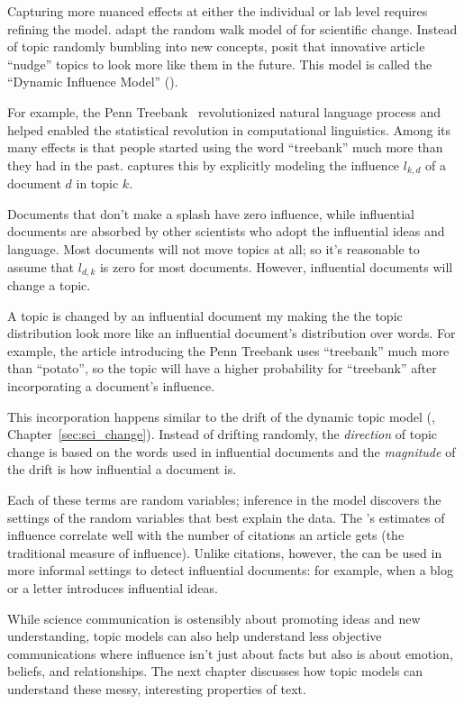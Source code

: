 Capturing more nuanced effects at either the individual or lab level requires
refining the model.  \citet{gerrish-10} adapt the random walk model of
\citet{wang-08} for scientific change.  Instead of topic randomly bumbling into
new concepts, \citet{gerrish-10} posit that innovative article ``nudge'' topics
to look more like them in the future.  This model is called the ``Dynamic
Influence Model'' ().

For example, the Penn Treebank~\citep{marcus-93} revolutionized natural language
process and helped enabled the statistical revolution in computational
linguistics.  Among its many effects is that people started using the word
``treebank'' much more than they had in the past.   captures this by
explicitly modeling the influence $l_{k,d}$ of a document $d$ in topic
$k$.

Documents that don't make a splash have zero influence, while influential
documents are absorbed by other scientists who adopt the influential ideas and
language.  Most documents will not move topics
at all; so it's reasonable to assume that $l_{d,k}$ is zero for most
documents.  However, influential documents will change a topic.

A topic is changed by an influential document my making the the topic
distribution look more like an influential document's distribution
over words.  For example, the article
introducing the Penn Treebank uses ``treebank'' much more than
``potato'', so the topic will have a higher probability for
``treebank'' after incorporating a document's influence.

This incorporation happens similar to the drift of the dynamic topic
model (, Chapter~\ref{sec:sci_change}).  Instead of drifting
randomly, the \emph{direction} of topic change is based on the words
used in influential documents and the \emph{magnitude} of the drift is
how influential a document is.

Each of these terms are random variables; inference in the model discovers the
settings of the random variables that best explain the data.  The 's
estimates of influence correlate well with the number of citations an article
gets (the traditional measure of influence).  Unlike citations, however, the
 can be used in more informal settings to detect influential
documents: for example, when a blog or a letter introduces influential
ideas.

While science communication is ostensibly about promoting ideas and new
understanding, topic models can also help understand less objective
communications where influence isn't just about facts but also is about emotion,
beliefs, and relationships.  The next chapter discusses how topic models can
understand these messy, interesting properties of text.
